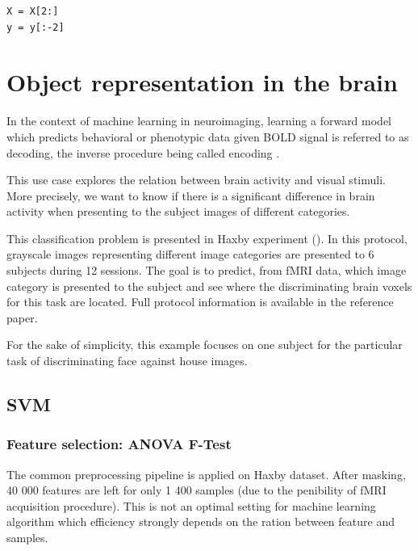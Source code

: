 \documentclass{frontiersSCNS} %
\begin{document}

\begin{lstlisting}
X = X[2:]
y = y[:-2]
\end{lstlisting}

\section{Object representation in the brain}

In the context of machine learning in neuroimaging, learning a forward model
which predicts behavioral or phenotypic data given BOLD signal is referred to as
decoding, the inverse procedure being called encoding \cite{Naselaris2011}.

This use case explores the relation between brain activity and visual
stimuli. More precisely, we want to know if there is a significant difference
in brain activity when presenting to the subject images of different categories.

This classification problem is presented in Haxby experiment (\cite{haxby2001}).
In this protocol, grayscale images representing different image categories
are presented to 6 subjects during 12 sessions. The goal is to predict,
from fMRI data, which image category is presented
to the subject and see where the discriminating brain voxels for this task are
located. Full protocol information is available in the reference paper.

For the sake of simplicity, this example focuses on one subject for the
particular task of discriminating face against house images.

\subsection{SVM}

\subsubsection{Feature selection: ANOVA F-Test}

The common preprocessing pipeline is applied on Haxby dataset. After masking, 40
000 features are left for only 1 400 samples (due to the penibility of fMRI
acquisition procedure). This is not an optimal setting for machine learning
algorithm which efficiency strongly depends on the ration between feature and
samples.
\end{document}
